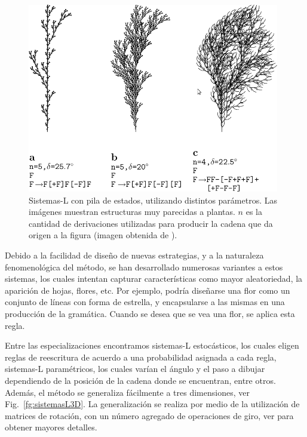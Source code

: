 \begin{figure}
\center
\includegraphics[width=11cm]{figures/sistemalcorchete}
\caption[Sistemas-L con pila de estados, utilizando distintos parámetros]{Sistemas-L con pila de estados, utilizando distintos parámetros. Las imágenes muestran estructuras muy parecidas a plantas. $n$ es la cantidad de derivaciones utilizadas para producir la cadena que da origen a la figura (imagen obtenida de \cite{Prusinkiewicz1990}).}
\label{fg:sistemasLcorchete}
\end{figure}


Debido a la facilidad de diseño de nuevas estrategias, y a la naturaleza fenomenológica del método, se han desarrollado numerosas variantes a estos sistemas, los cuales intentan capturar características como mayor aleatoriedad, la aparición de hojas, flores, etc.
Por ejemplo, podría diseñarse una flor como un conjunto de líneas con forma de estrella, y encapsularse a las mismas en una producción de la gramática.
Cuando se desea que se vea una flor, se aplica esta regla.


Entre las especializaciones encontramos sistemas-L estocásticos, los cuales eligen reglas de reescritura de acuerdo a una probabilidad asignada a cada regla, sistemas-L paramétricos, los cuales varían el ángulo y el paso a dibujar dependiendo de la posición de la cadena donde se encuentran, entre otros.
Además, el método se generaliza fácilmente a tres dimensiones, ver Fig.~\ref{fg:sistemasL3D}.
La generalización se realiza por medio de la utilización de matrices de rotación, con un número agregado de operaciones de giro, ver \cite{Prusinkiewicz1990} para obtener mayores detalles.

